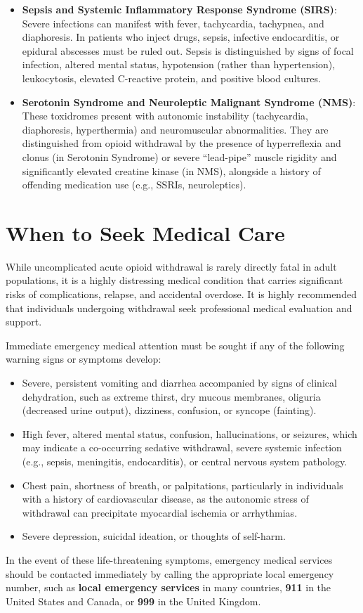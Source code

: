 \begin{itemize}
    \item \textbf{Sepsis and Systemic Inflammatory Response Syndrome (SIRS)}: Severe infections can manifest with fever, tachycardia, tachypnea, and diaphoresis. In patients who inject drugs, sepsis, infective endocarditis, or epidural abscesses must be ruled out. Sepsis is distinguished by signs of focal infection, altered mental status, hypotension (rather than hypertension), leukocytosis, elevated C-reactive protein, and positive blood cultures.
    \item \textbf{Serotonin Syndrome and Neuroleptic Malignant Syndrome (NMS)}: These toxidromes present with autonomic instability (tachycardia, diaphoresis, hyperthermia) and neuromuscular abnormalities. They are distinguished from opioid withdrawal by the presence of hyperreflexia and clonus (in Serotonin Syndrome) or severe ``lead-pipe'' muscle rigidity and significantly elevated creatine kinase (in NMS), alongside a history of offending medication use (e.g., SSRIs, neuroleptics).
\end{itemize}

\section*{When to Seek Medical Care}
While uncomplicated acute opioid withdrawal is rarely directly fatal in adult populations, it is a highly distressing medical condition that carries significant risks of complications, relapse, and accidental overdose. It is highly recommended that individuals undergoing withdrawal seek professional medical evaluation and support.

Immediate emergency medical attention must be sought if any of the following warning signs or symptoms develop:
\begin{itemize}
    \item Severe, persistent vomiting and diarrhea accompanied by signs of clinical dehydration, such as extreme thirst, dry mucous membranes, oliguria (decreased urine output), dizziness, confusion, or syncope (fainting).
    \item High fever, altered mental status, confusion, hallucinations, or seizures, which may indicate a co-occurring sedative withdrawal, severe systemic infection (e.g., sepsis, meningitis, endocarditis), or central nervous system pathology.
    \item Chest pain, shortness of breath, or palpitations, particularly in individuals with a history of cardiovascular disease, as the autonomic stress of withdrawal can precipitate myocardial ischemia or arrhythmias.
    \item Severe depression, suicidal ideation, or thoughts of self-harm.
\end{itemize}
In the event of these life-threatening symptoms, emergency medical services should be contacted immediately by calling the appropriate local emergency number, such as \textbf{local emergency services} in many countries, \textbf{911} in the United States and Canada, or \textbf{999} in the United Kingdom.

